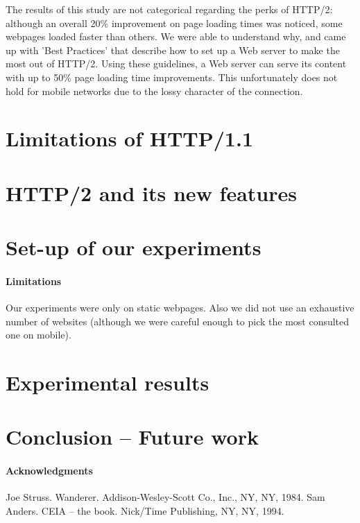 \documentclass[10pt,aps,showpacs,nofootinbib,superscriptaddress,eqsecnum,prd,showkeys,twocolumn,notitlepage]{article}
\begin{document}
The results of this study are not categorical regarding the perks of HTTP/2: although an overall 20\% improvement on page loading times was noticed, some webpages loaded faster than others. We were able to understand why, and came up with 'Best Practices' that describe how to set up a Web server to make the most out of HTTP/2. Using these guidelines, a Web server can serve its content with up to 50\% page loading time improvements. This unfortunately does not hold for mobile networks due to the lossy character of the connection.


\section{Limitations of HTTP/1.1}

\section{HTTP/2 and its new features}

\section{Set-up of our experiments}
\paragraph{Limitations}
Our experiments were only on static webpages. Also we did not use an exhaustive number of websites (although we were careful enough to pick the most consulted one on mobile).

\section{Experimental results}

\section{Conclusion -- Future work}

\paragraph{Acknowledgments}

\begin{thebibliography}{9}
 Joe Struss. Wanderer.
Addison-Wesley-Scott Co., Inc., NY, NY, 1984.
 Sam Anders. CEIA -- the book.
Nick/Time Publishing, NY, NY, 1994.
\end{thebibliography}
\end{document}
